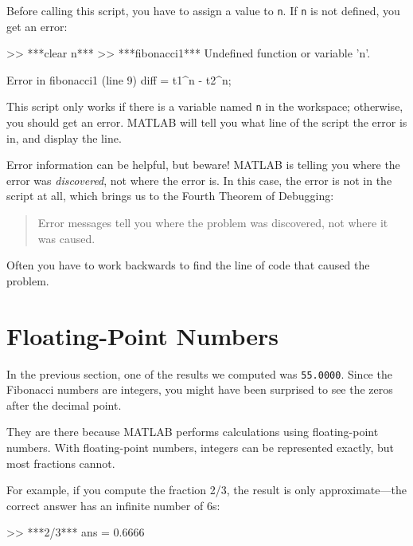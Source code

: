 Before calling this script, you have to assign a value to \lstinline{n}.
If \lstinline{n} is not defined, you get an error:

\begin{code}
>> ***clear n***
>> ***fibonacci1***
Undefined function or variable 'n'.

Error in fibonacci1 (line 9)
diff = t1^n - t2^n;
\end{code}

This script only works if there is a variable named \lstinline{n} in the workspace; otherwise, you should get an error. 
MATLAB will tell you what line of the script the error is in, and display the line.



Error information can be helpful, but beware!  MATLAB is telling you
where the error was \emph{discovered}, not where the error is.  In this
case, the error is not in the script at all, which brings us to the Fourth Theorem of Debugging:

\begin{quote}
Error messages tell you where the problem was discovered,
not where it was caused.
\end{quote}

Often you have to work backwards to find the line of code that caused the problem.

\section{Floating-Point Numbers}

In the previous section, one of the results we computed was \lstinline{55.0000}.  Since the Fibonacci numbers are integers, you might have been surprised to see the zeros after the decimal point.

They are there because MATLAB performs calculations using floating-point numbers.  With floating-point numbers, integers can be represented exactly, but most fractions cannot.


For example, if you compute the fraction 2/3, the result is only approximate---the correct answer has an infinite number of 6s:

\begin{code}
>> ***2/3***
ans = 0.6666
\end{code}

